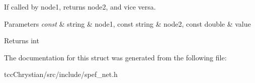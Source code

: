 If called by node1, returns node2, and vice versa. 


\begin{DoxyParams}{Parameters}
{\em const} & string \& node1, const string \& node2, const double \& value\\
\hline
\end{DoxyParams}
\begin{DoxyReturn}{Returns}
int 
\end{DoxyReturn}


The documentation for this struct was generated from the following file\-:\begin{DoxyCompactItemize}
\item 
tcc\-Chrystian/src/include/spef\-\_\-net.\-h\end{DoxyCompactItemize}
